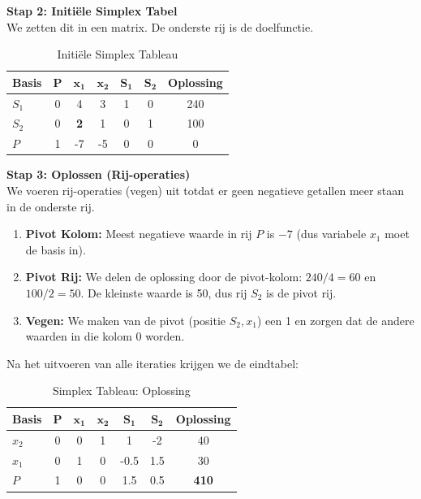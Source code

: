 \documentclass[a4paper,11pt]{article}
\begin{document}
\textbf{Stap 2: Initiële Simplex Tabel} \\
We zetten dit in een matrix. De onderste rij is de doelfunctie.

\begin{table}[H]
    \centering
    \caption{Initiële Simplex Tableau}
    \begin{tabular}{lcccccc}
        \toprule
        \textbf{Basis} & $\mathbf{P}$ & $\mathbf{x_1}$ & $\mathbf{x_2}$ & $\mathbf{S_1}$ & $\mathbf{S_2}$ & \textbf{Oplossing} \\
        \midrule
        $S_1$          & 0            & 4              & 3              & 1              & 0              & 240                \\
        $S_2$          & 0            & \textbf{2}     & 1              & 0              & 1              & 100                \\
        \midrule
        $P$            & 1            & -7             & -5             & 0              & 0              & 0                  \\
        \bottomrule
    \end{tabular}
\end{table}

\textbf{Stap 3: Oplossen (Rij-operaties)} \\
We voeren rij-operaties (vegen) uit totdat er geen negatieve getallen meer staan in de onderste rij.
\begin{enumerate}
    \item \textbf{Pivot Kolom:} Meest negatieve waarde in rij $P$ is $-7$ (dus variabele $x_1$ moet de basis in).
    \item \textbf{Pivot Rij:} We delen de oplossing door de pivot-kolom: $240/4 = 60$ en $100/2 = 50$. De kleinste waarde is 50, dus rij $S_2$ is de pivot rij.
    \item \textbf{Vegen:} We maken van de pivot (positie $S_2, x_1$) een 1 en zorgen dat de andere waarden in die kolom 0 worden.
\end{enumerate}
Na het uitvoeren van alle iteraties krijgen we de eindtabel:

\begin{table}[H]
    \centering
    \caption{Simplex Tableau: Oplossing}
    \begin{tabular}{lcccccc}
        \toprule
        \textbf{Basis} & $\mathbf{P}$ & $\mathbf{x_1}$ & $\mathbf{x_2}$ & $\mathbf{S_1}$ & $\mathbf{S_2}$ & \textbf{Oplossing} \\
        \midrule
        $x_2$          & 0            & 0              & 1              & 1              & -2             & 40                 \\
        $x_1$          & 0            & 1              & 0              & -0.5           & 1.5            & 30                 \\
        \midrule
        $P$            & 1            & 0              & 0              & 1.5            & 0.5            & \textbf{410}       \\
        \bottomrule
    \end{tabular}
\end{table}
\end{document}
